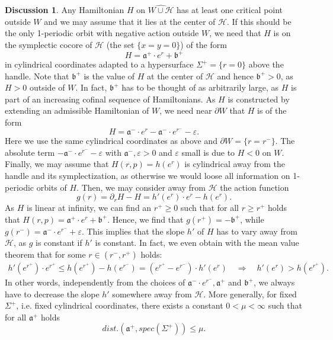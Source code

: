 \documentclass[a4paper,12pt,bibliography=totocnumbered,titlepage=false,abstracton,bookmarksnumbered=true]{scrartcl}
\newcommand{\veps}{\varepsilon}
\theoremstyle{definition}
\newtheorem{dis}[defn]{Discussion}
\begin{document}
\begin{dis} \label{dis1}
Any Hamiltonian $H$ on $\widehat{W{\cup} \mathcal{H}}$ has at least one critical point outside $W$ and we may assume that it lies at the center of $\mathcal{H}$. If this should be the only 1-periodic orbit with negative action outside $W$, we need that $H$ is on the symplectic cocore of $\mathcal{H}$ (the set $\{x=y=0\}$) of the form
\[H=\mathfrak{a}^+{\cdot} e^r+\mathfrak{b}^+\]
in cylindrical coordinates adapted to a hypersurface $\Sigma^+=\{r{=}0\}$ above the handle. Note that $\mathfrak{b}^+$ is the value of $H$ at the center of $\mathcal{H}$ and hence $\mathfrak{b}^+>0$, as $H>0$ outside of $W$. In fact, $\mathfrak{b}^+$ has to be thought of as arbitrarily large, as $H$ is part of an increasing cofinal sequence of Hamiltonians. As $H$ is constructed by extending an admissible Hamiltonian of $W$, we need near $\partial W$ that $H$ is of the form
\[H=\mathfrak{a}^-{\cdot} e^r-\mathfrak{a}^-{\cdot} e^{r^-}-\veps.\]
Here we use the same cylindrical coordinates as above and $\partial W=\{r{=}r^-\}$. The absolute term $-\mathfrak{a}^-{\cdot} e^{r^-}-\veps$ with $\mathfrak{a}^-,\veps>0$ and $\veps$ small is due to $H<0$ on $W$.\\
Finally, we may assume that $H(r,p)=h(e^r)$ is cylindrical away from the handle and its symplectization, as otherwise we would loose all information on 1-periodic orbits of $H$. Then, we may consider away from $\mathcal{H}$ the action function
\[g(r)=\partial_r H-H=h'(e^r)\cdot e^r-h(e^r).\]
As $H$ is linear at infinity, we can find an $r^+\geq 0$ such that for all $r\geq r^+$ holds that $H(r,p)=\mathfrak{a}^+{\cdot} e^r+\mathfrak{b}^+$. Hence, we find that $g(r^+)=-\mathfrak{b}^+$, while $g(r^-)=\mathfrak{a}^-{\cdot} e^{r^-}+\veps$. This implies that the slope $h'$  of $H$ has to vary away from $\mathcal{H}$, as $g$ is constant if $h'$ is constant. In fact, we even obtain with the mean value theorem that for some $r\in(r^-,r^+)$ holds:
\begin{align*}
  h'(e^{r^+})\cdot e^{r^+}\leq h(e^{r^+})- h(e^{r^-}) = (e^{r^+}-e^{r^-})\cdot h'(e^r)\quad\Rightarrow\quad h'(e^r)>h(e^{r^+}).
\end{align*}
In other words, independently from the choices of $\mathfrak{a}^-{\cdot} e^{r^-},\mathfrak{a} ^+$ and $\mathfrak{b}^+$, we always have to decrease the slope $h'$ somewhere away from $\mathcal{H}$. More generally, for fixed $\Sigma^+$, i.e. fixed cylindrical coordinates, there exists a constant $0<\mu<\infty$ such that for all $\mathfrak{a}^+$ holds
\[dist.(\mathfrak{a}^+, spec(\Sigma^+))\leq \mu.\]

\end{dis}
\end{document}
